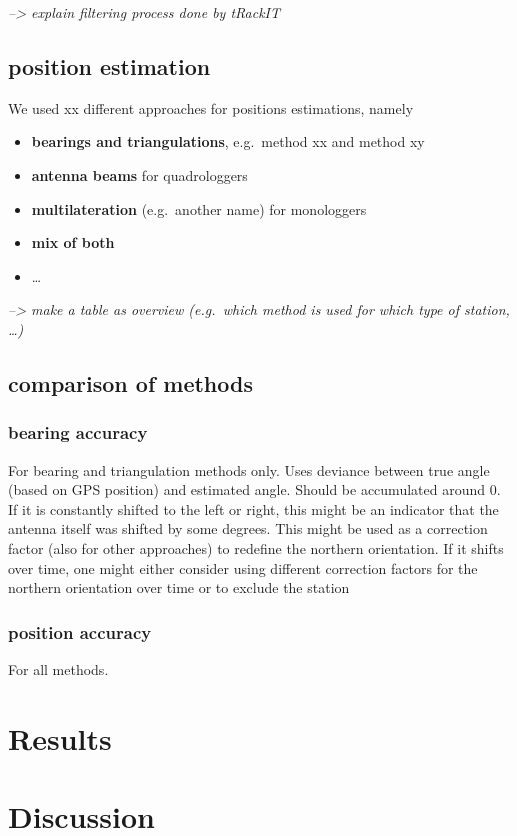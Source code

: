 \documentclass[
]{article}
\providecommand{\tightlist}{%
  \setlength{\itemsep}{0pt}\setlength{\parskip}{0pt}}\usepackage{longtable,booktabs,array}
\begin{document}
\emph{--\textgreater{} explain filtering process done by tRackIT}

\hypertarget{position-estimation}{%
\subsection{position estimation}\label{position-estimation}}

We used xx different approaches for positions estimations, namely

\begin{itemize}
\tightlist
\item
  \textbf{bearings and triangulations}, e.g.~method xx and method xy\\
\item
  \textbf{antenna beams} for quadrologgers\\
\item
  \textbf{multilateration} (e.g.~another name) for monologgers\\
\item
  \textbf{mix of both}\\
\item
  \ldots{}
\end{itemize}

\emph{--\textgreater{} make a table as overview (e.g.~which method is
used for which type of station, \ldots)}

\hypertarget{comparison-of-methods}{%
\subsection{comparison of methods}\label{comparison-of-methods}}

\hypertarget{bearing-accuracy}{%
\subsubsection{bearing accuracy}\label{bearing-accuracy}}

For bearing and triangulation methods only. Uses deviance between true
angle (based on GPS position) and estimated angle. Should be accumulated
around 0. If it is constantly shifted to the left or right, this might
be an indicator that the antenna itself was shifted by some degrees.
This might be used as a correction factor (also for other approaches) to
redefine the northern orientation. If it shifts over time, one might
either consider using different correction factors for the northern
orientation over time or to exclude the station

\hypertarget{position-accuracy}{%
\subsubsection{position accuracy}\label{position-accuracy}}

For all methods.

\hypertarget{results}{%
\section{Results}\label{results}}

\hypertarget{discussion}{%
\section{Discussion}\label{discussion}}


\printbibliography[title=References]
\end{document}

